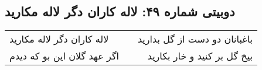 \begin{center}
\section*{دوبیتی شماره ۴۹: لاله کاران دگر لاله مکارید}
\label{sec:049}
\begin{longtable}{l p{0.5cm} r}
لاله کاران دگر لاله مکارید
&&
باغبانان دو دست از گل بدارید
\\
اگر عهد گلان این بو که دیدم
&&
بیخ گل بر کنید و خار بکارید
\\
\end{longtable}
\end{center}
